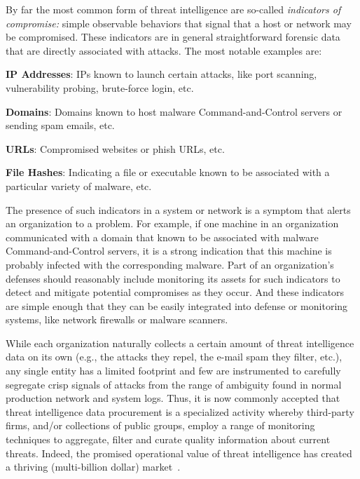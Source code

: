 By far the most common form of threat intelligence are so-called 
\emph{indicators of compromise:} simple observable behaviors that 
signal that a host or network may be compromised. These indicators 
are in general straightforward forensic data that are directly 
associated with attacks. The most notable examples are:
\begin{prettylist}
    \item \textbf{IP Addresses}: IPs known to launch certain 
    attacks, like port scanning, vulnerability probing, brute-force login, etc.
    \item \textbf{Domains}: Domains known to host 
    malware Command-and-Control servers or sending spam emails, etc.
    \item \textbf{URLs}: Compromised websites or phish URLs, etc.
    \item \textbf{File Hashes}: Indicating a file or executable 
    known to be associated with a particular variety of malware, etc.
\end{prettylist}

The presence of such indicators in a system or network is a symptom 
that alerts an organization to a problem. For example, if one 
machine in an organization communicated with a domain that known to be
associated with malware Command-and-Control servers, it is a strong
indication that this machine is probably infected with the 
corresponding malware. Part of an organization's defenses 
should reasonably include monitoring its assets
for such indicators to detect and mitigate potential compromises as
they occur. And these indicators are simple enough that they can be
easily integrated into defense or monitoring systems, like network
firewalls or malware scanners.

While each organization naturally collects a certain amount of threat
intelligence data on its own (e.g., the attacks they repel, the e-mail
spam they filter, etc.), any single entity has a limited footprint and
few are instrumented to carefully segregate crisp signals of attacks
from the range of ambiguity found in normal production network and
system logs. Thus, it is now commonly accepted that threat
intelligence data procurement is a specialized activity whereby
third-party firms, and/or collections of public groups, employ a range
of monitoring techniques to aggregate, filter and curate quality
information about current threats.  Indeed, the promised operational
value of threat intelligence has created a thriving (multi-billion
dollar) market~\cite{timarket}. 


